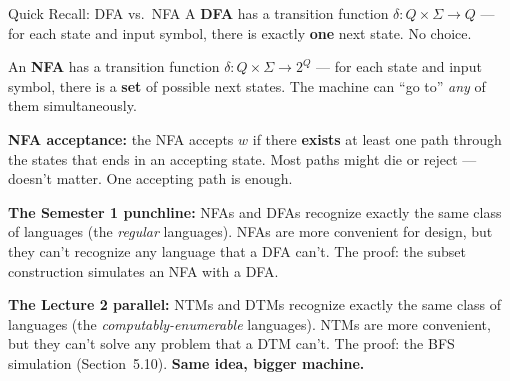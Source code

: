 \begin{notebox}{Quick Recall: DFA vs.\ NFA}
A \textbf{DFA} has a transition function $\delta \colon Q \times \Sigma \to Q$
--- for each state and input symbol, there is exactly \textbf{one} next state.
No choice.

An \textbf{NFA} has a transition function
$\delta \colon Q \times \Sigma \to 2^Q$ --- for each state and input symbol,
there is a \textbf{set} of possible next states. The machine can ``go to''
\emph{any} of them simultaneously.

\textbf{NFA acceptance:} the NFA accepts $w$ if there \textbf{exists} at least
one path through the states that ends in an accepting state. Most paths might
die or reject --- doesn't matter. One accepting path is enough.

\textbf{The Semester 1 punchline:} NFAs and DFAs recognize exactly the same
class of languages (the \emph{regular} languages). NFAs are more convenient for
design, but they can't recognize any language that a DFA can't. The proof:
the subset construction simulates an NFA with a DFA.

\textbf{The Lecture 2 parallel:} NTMs and DTMs recognize exactly the same class
of languages (the \emph{computably-enumerable} languages). NTMs are more
convenient, but they can't solve any problem that a DTM can't. The proof:
the BFS simulation (Section~5.10). \textbf{Same idea, bigger machine.}
\end{notebox}

